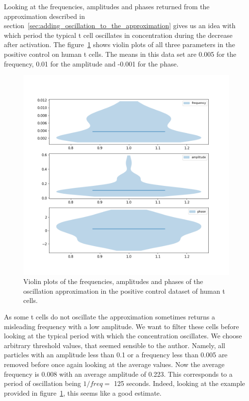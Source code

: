 Looking at the frequencies, amplitudes and phases returned from the approximation described in section~\ref{sec:adding_oscillation_to_the_approximation} gives us an idea with which period the typical t cell oscillates in \Calcium concentration during the decrease after activation. The figure~\ref{fig:freq_amp} shows violin plots of all three parameters in the positive control on human t cells. The means in this data set are 0.005 for the frequency, 0.01 for the amplitude and -0.001 for the phase.

\begin{figure}[h]
	\centering
	\includegraphics[width=\textwidth]{fig/freq_amp}
	
	\caption{Violin plots of the frequencies, amplitudes and phases of the oscillation approximation in the positive control dataset of human t cells.}
	\label{fig:freq_amp}
\end{figure}

As some t cells do not oscillate the approximation sometimes returns a misleading frequency with a low amplitude. We want to filter these cells before looking at the typical period with which the \Calcium concentration oscillates. We choose arbitrary threshold values, that seemed sensible to the author. Namely, all particles with an amplitude less than 0.1 or a frequency less than 0.005 are removed before once again looking at the average values. Now the average frequency is 0.008 with an average amplitude of 0.223. This corresponds to a period of oscillation being $1/freq = $ 125 seconds. Indeed, looking at the example provided in figure~\ref{fig:freq_amp}, this seems like a good estimate.

